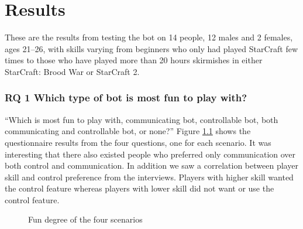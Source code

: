 \chapter{Results}
These are the results from testing the bot on 14 people, 12 males and 2 females, ages 21–26, with skills varying from beginners who only had played StarCraft few times to those who have played more than 20 hours skirmishes in either StarCraft: Brood War or StarCraft 2.

\subsection{RQ 1 Which type of bot is most fun to play with?}
``Which is most fun to play with, communicating bot, controllable bot, both communicating and controllable bot, or none?''
Figure \ref{fig:results_fun} shows the questionnaire results from the four questions, one for each scenario. It was interesting that there also existed people who preferred only communication over both control and communication. In addition we saw a correlation between player skill and control preference from the interviews. Players with higher skill wanted the control feature whereas players with lower skill did not want or use the control feature.

\begin{figure}[htb]
\caption{Fun degree of the four scenarios}
\label{fig:results_fun}
\end{figure}

